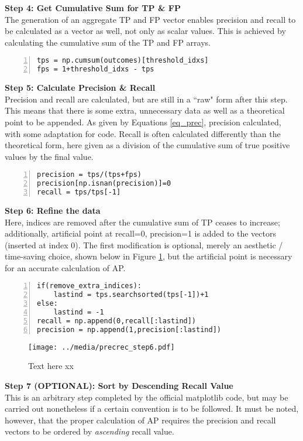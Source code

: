 \textbf{{\large Step 4: Get Cumulative Sum for TP \& FP }} \\
The generation of an aggregate TP and FP vector enables precision and recall to be calculated as a vector as well, not only as scalar values. This is achieved by calculating the cumulative sum of the TP and FP arrays.
\begin{lstlisting}[numbers=left]
tps = np.cumsum(outcomes)[threshold_idxs]
fps = 1+threshold_idxs - tps
\end{lstlisting}


\textbf{{\large Step 5: Calculate Precision \& Recall}} \\
Precision and recall are calculated, but are still in a ``raw" form after this step. This means that there is some extra, unnecessary data as well as a theoretical point to be appended. As given by Equations \ref{eq_prec}, precision calculated, with some adaptation for code. Recall is often calculated differently than the theoretical form, here given as a division of the cumulative sum of true positive values by the final value.

\begin{lstlisting}[numbers=left]
precision = tps/(tps+fps)
precision[np.isnan(precision)]=0
recall = tps/tps[-1]
\end{lstlisting}


\textbf{{\large Step 6: Refine the data}} \\
Here, indices are removed after the cumulative sum of TP ceases to increase; additionally, artificial point at recall=0, precision=1 is added to the vectors (inserted at index 0). The first modification is optional, merely an aesthetic / time-saving choice, shown below in Figure \ref{precrec_step6}, but the artificial point is necessary for an accurate calculation of AP. 

\begin{lstlisting}[numbers=left]
if(remove_extra_indices):
    lastind = tps.searchsorted(tps[-1])+1
else:
    lastind = -1
recall = np.append(0,recall[:lastind])
precision = np.append(1,precision[:lastind])
\end{lstlisting}

\begin{figure}[h]
    \centering
    \texttt{[image: ../media/precrec\_step6.pdf]}
    \caption{Text here xx}
    \label{precrec_step6}
\end{figure}

\textbf{{\large Step 7 (OPTIONAL): Sort by Descending Recall Value}} \\
This is an arbitrary step completed by the official matplotlib code, but may be carried out nonetheless if a certain convention is to be followed. It must be noted, however, that the proper calculation of AP requires the precision and recall vectors to be ordered by \textit{ascending} recall value.

